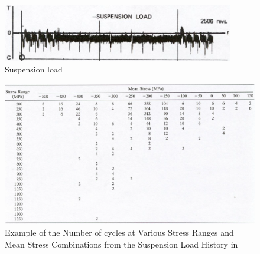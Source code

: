\begin{figure}[h!]
	\centering
	\includegraphics[width=0.9\textwidth]{figures//loadhistory.png} 
	\caption{Suspension load}
	\label{loadhistory}
\end{figure}

\begin{figure}[h!]
	\centering
	\includegraphics[width=\textwidth]{figures//loadhistory1.png} 
	\caption{Example of the Number of cycles at Various Stress Ranges and Mean Stress Combinations from the Suspension Load History in }
	\label{loadhistory1}
\end{figure}




